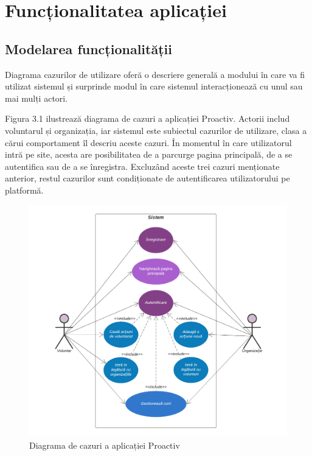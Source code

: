 \documentclass[12pt,a4paper]{report}
\begin{document}
\chapter{Funcționalitatea aplicației}
\section{Modelarea funcționalității}
\par
Diagrama cazurilor de utilizare oferă o descriere generală a modului în care va fi utilizat sistemul și surprinde modul în care sistemul interacționează cu unul sau mai mulți actori.
\\
\par
Figura 3.1 ilustrează diagrama de cazuri a aplicației Proactiv. Actorii includ voluntarul și organizația, iar sistemul este subiectul cazurilor de utilizare, clasa a cărui comportament îl descriu aceste cazuri. 
În momentul în care utilizatorul intră pe site, acesta are posibilitatea de a parcurge pagina principală, de a se autentifica sau de a se înregistra. Excluzând aceste trei cazuri menționate anterior, restul cazurilor sunt condiționate de autentificarea utilizatorului pe platformă.
\\
\begin{figure}[h!]
  \centering
    \includegraphics[width=0.7\linewidth]{./imagini/UseCase.png}
    \caption{Diagrama de cazuri a aplicației Proactiv}
\end{figure}
\end{document}
